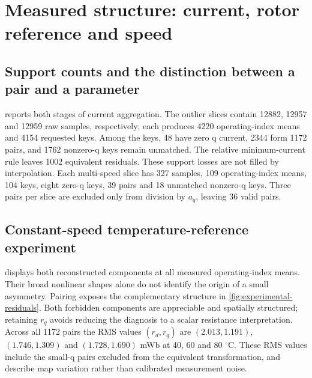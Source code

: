 \section{Measured structure: current, rotor reference and speed}
\label{sec:experimental-results}
\subsection{Support counts and the distinction between a pair and a parameter}
 reports both stages of current aggregation.
The outlier slices contain 12882, 12957 and 12959 raw samples, respectively;
each produces 4220 operating-index means and 4154 requested keys. Among the
keys, 48 have zero q current, 2344 form 1172 pairs, and 1762 nonzero-q keys
remain unmatched. The relative minimum-current rule leaves 1002 equivalent
residuals. These support losses are not filled by interpolation.
Each multi-speed slice has 327 samples, 109 operating-index means, 104 keys,
eight zero-q keys, 39 pairs and 18 unmatched nonzero-q keys. Three pairs per
slice are excluded only from division by $a_q$, leaving 36 valid pairs.

\begin{table}[tb]
\centering\small

\caption{Reproduced slice counts and high-current $\Delta R_{\mathrm{eq}}$
summaries. $N_{\rm op}$ counts operating-index groups; $N_{\rm key}$ counts
aggregated requested points. Valid means $a_q/a_{q,\max}>0.10$; high means
$a_q/a_{q,\max}\geq0.85$. Medians and raw MAD describe the high subset only.}
\label{tab:experimental-summary}
\end{table}

\subsection{Constant-speed temperature-reference experiment}
 displays both reconstructed components at all
measured operating-index means. Their broad nonlinear shapes alone do not
identify the origin of a small asymmetry. Pairing exposes the complementary
structure in \cref{fig:experimental-residuals}. Both forbidden components
are appreciable and spatially structured; retaining $r_q$ avoids reducing
the diagnosis to a scalar resistance interpretation.
Across all 1172 pairs the RMS values $(r_d,r_q)$ are
$(2.013,1.191)$, $(1.746,1.309)$ and $(1.728,1.690)$ mWb at 40, 60 and
80 $^\circ$C. These RMS values include the small-q pairs excluded from
the equivalent transformation, and describe map variation rather than
calibrated measurement noise.



